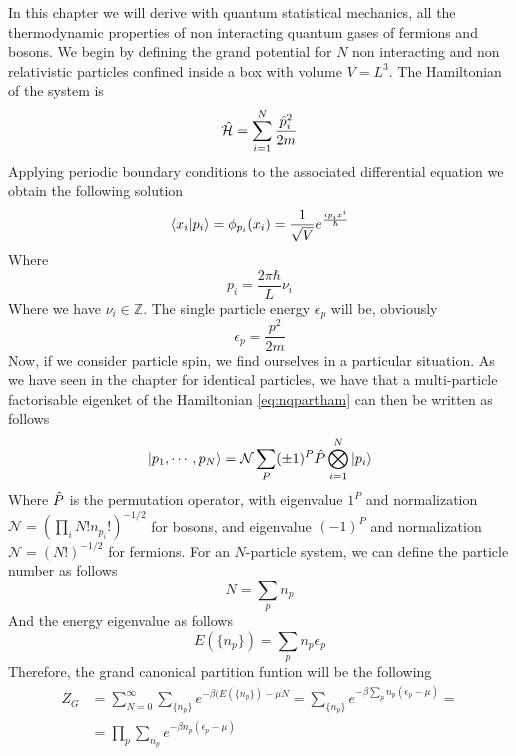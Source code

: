 \documentclass[../qm.tex]{subfiles}
\begin{document}
	In this chapter we will derive with quantum statistical mechanics, all the thermodynamic properties of non interacting quantum gases of fermions and bosons.
	We begin by defining the grand potential for $N$ non interacting and non relativistic particles confined inside a box with volume $V=L^3$. The Hamiltonian of the system is
	\begin{equation}
		\hat{\mathcal{H}}=\sum_{i=1}^N\frac{\hat{p}_i^2}{2m}
		\label{eq:nqpartham}
	\end{equation}
	Applying periodic boundary conditions to the associated differential equation we obtain the following solution
	\begin{equation}
		\bra{x_i}\ket{p_i}=\phi_{p_i}(x_i)=\frac{1}{\sqrt{V}}e^{\frac{ip_ix^i}{\hbar}}
		\label{eq:manyparticlesolution}
	\end{equation}
	Where
	\begin{equation}
		p_i=\frac{2\pi\hbar}{L}\nu_i
		\label{eq:momentummanyparticle}
	\end{equation}
	Where we have $\nu_i\in\mathbb{Z}$. The single particle energy $\epsilon_p$ will be, obviously
	\begin{equation}
		\epsilon_p=\frac{p^2}{2m}
		\label{eq:singlefreeparticleenergy}
	\end{equation}
	Now, if we consider particle spin, we find ourselves in a particular situation. As we have seen in the chapter for identical particles, we have that a multi-particle factorisable eigenket of the Hamiltonian \eqref{eq:nqpartham} can then be written as follows
	\begin{equation}
		\ket{p_1,\cdots,p_N}=\mathcal{N}\sum_{P}(\pm1)^{P}\hat{P}\bigotimes_{i=1}^N\ket{p_i}
		\label{eq:fermionbosondef}
	\end{equation}
	Where $\hat{P}$ is the permutation operator, with eigenvalue $1^P$ and normalization $\mathcal{N}=(\prod_iN!n_{p_i}!)^{-1/2}$ for bosons, and eigenvalue $(-1)^P$ and normalization $\mathcal{N}=(N!)^{-1/2}$ for fermions.
	For an $N$-particle system, we can define the particle number as follows
	\begin{equation}
		N=\sum_pn_p
		\label{eq:partnumber}
	\end{equation}
	And the energy eigenvalue as follows
	\begin{equation}
		E(\{n_p\})=\sum_pn_p\epsilon_p
		\label{eq:energyeigenvalue}
	\end{equation}
	Therefore, the grand canonical partition funtion will be the following
	\begin{equation}
		\begin{aligned}
			Z_G&=\sum_{N=0}^{\infty}\sum_{\{n_p\}}e^{-\beta(E(\{n_p\})-\mu N}=\sum_{\{n_p\}}e^{-\beta\sum_pn_p(\epsilon_p-\mu)}=\\
			&=\prod_p\sum_{n_p}e^{-\beta n_p(\epsilon_p-\mu)}
		\end{aligned}
		\label{eq:grandcanonidealqgas1}
	\end{equation}
\end{document}

